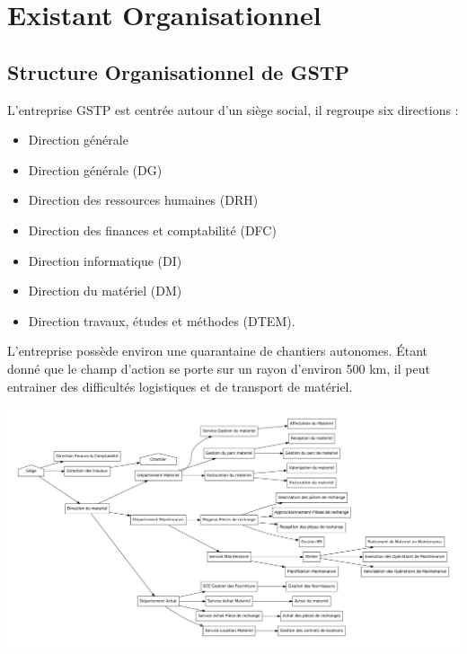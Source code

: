 \section{Existant Organisationnel}
    \subsection{Structure Organisationnel de GSTP}

		L'entreprise GSTP est centrée autour d'un siège social, il regroupe six directions :
	    \begin{itemize}
            \item Direction générale
            \item Direction générale (DG)
			\item Direction des ressources humaines (DRH)
			\item Direction des finances et comptabilité (DFC)
			\item Direction informatique (DI)
			\item Direction du matériel (DM)
			\item Direction travaux, études et méthodes (DTEM).
        \end{itemize}
        L'entreprise possède environ une quarantaine de chantiers autonomes. Étant donné que le champ d'action se porte sur un rayon d'environ 500 km, il peut entrainer des difficultés logistiques et de transport de matériel.

		\includegraphics[width=\textwidth]{img/structureOrganisationnel.pdf} 
		
